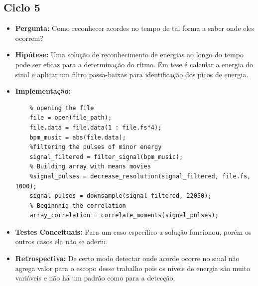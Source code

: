 \subsection{Ciclo 5}
\label{subsec:ciclo_5}
\begin{itemize}
\item \textbf{Pergunta:} Como reconhecer acordes no tempo de tal forma a saber onde eles ocorrem?
\item \textbf{Hipótese:} Uma solução de reconhecimento de energias ao longo do tempo pode ser eficaz para a determinação do rítmo. Em tese é calcular a energia do sinal e aplicar um filtro passa-baixas para identificação dos picos de energia.
\item \textbf{Implementação:} 
\begin{lstlisting}
    % opening the file
    file = open(file_path);
    file.data = file.data(1 : file.fs*4);
    bpm_music = abs(file.data);
    %filtering the pulses of minor energy
    signal_filtered = filter_signal(bpm_music);
    % Building array with means movies
    %signal_pulses = decrease_resolution(signal_filtered, file.fs, 1000);
    signal_pulses = downsample(signal_filtered, 22050);
    % Beginnnig the correlation
    array_correlation = correlate_moments(signal_pulses);

\end{lstlisting}
\item \textbf{Testes Conceituais:} Para um caso específico a solução funcionou, porém os outros casos ela não se aderiu.    
\item \textbf{Retrospectiva:} De certo modo detectar onde acorde ocorre no sinal não agrega valor para o escopo desse trabalho pois os níveis de energia são muito variáveis e não há um padrão como para a detecção.
\end{itemize} 

